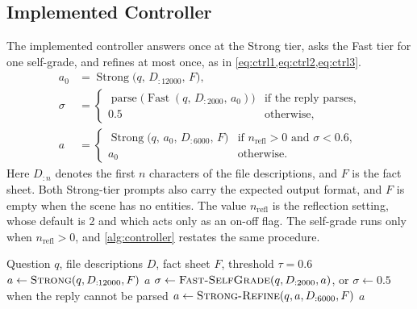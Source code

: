 \documentclass{article}
\begin{document}
\subsection{Implemented Controller}
\label{sec:controller}

The implemented controller answers once at the Strong tier, asks the Fast tier for one self-grade, and refines at most once, as in \cref{eq:ctrl1,eq:ctrl2,eq:ctrl3}.
\begin{align}
  a_0 &= \operatorname{Strong}\bigl(q,\, D_{:12000},\, F\bigr), \label{eq:ctrl1}\\
  \sigma &=
  \begin{cases}
    \operatorname{parse}\bigl(\operatorname{Fast}(q,\, D_{:2000},\, a_0)\bigr) & \text{if the reply parses},\\
    0.5 & \text{otherwise},
  \end{cases} \label{eq:ctrl2}\\
  a &=
  \begin{cases}
    \operatorname{Strong}\bigl(q,\, a_0,\, D_{:6000},\, F\bigr) & \text{if } n_{\text{refl}} > 0 \text{ and } \sigma < 0.6,\\
    a_0 & \text{otherwise.}
  \end{cases} \label{eq:ctrl3}
\end{align}
Here $D_{:n}$ denotes the first $n$ characters of the file descriptions, and $F$ is the fact sheet. Both Strong-tier prompts also carry the expected output format, and $F$ is empty when the scene has no entities. The value $n_{\text{refl}}$ is the reflection setting, whose default is 2 and which acts only as an on-off flag. The self-grade runs only when $n_{\text{refl}} > 0$, and \cref{alg:controller} restates the same procedure.

\begin{algorithm}[!htb]
\caption{This procedure is the implemented spatial reasoning controller, with $D_{:n}$ as defined above. The self-grade $\sigma$ is a self-reported heuristic. The code does not clip it, and it is not calibrated.}
\label{alg:controller}
\begin{algorithmic}[1]
\Require Question $q$, file descriptions $D$, fact sheet $F$, threshold $\tau = 0.6$
\State $a \gets \textsc{Strong}(q, D_{:12000}, F)$
  \State \Return $a$
\EndIf
\State $\sigma \gets \textsc{Fast-SelfGrade}(q, D_{:2000}, a)$, or $\sigma \gets 0.5$ when the reply cannot be parsed
\If{$\sigma < \tau$}
  \State $a \gets \textsc{Strong-Refine}(q, a, D_{:6000}, F)$ 
\EndIf
\State \Return $a$
\end{algorithmic}
\end{algorithm}
\end{document}
